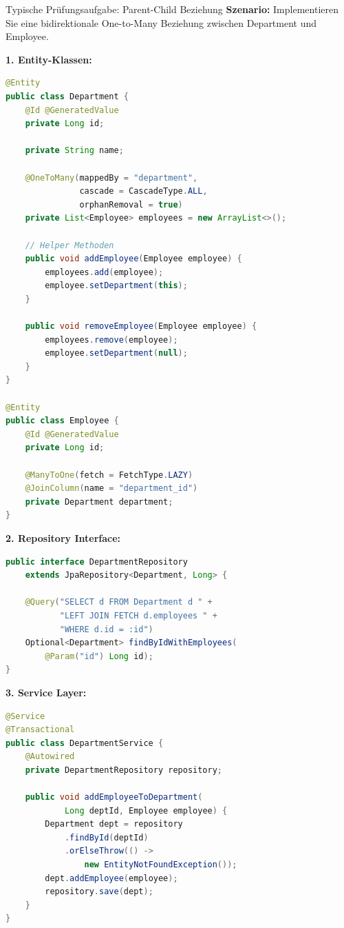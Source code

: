 \begin{example2}{Typische Prüfungsaufgabe: Parent-Child Beziehung}
\textbf{Szenario:}
Implementieren Sie eine bidirektionale One-to-Many Beziehung zwischen Department und Employee.

\textbf{1. Entity-Klassen:}
\begin{lstlisting}[language=Java, style=base]
@Entity
public class Department {
    @Id @GeneratedValue
    private Long id;
    
    private String name;
    
    @OneToMany(mappedBy = "department", 
               cascade = CascadeType.ALL,
               orphanRemoval = true)
    private List<Employee> employees = new ArrayList<>();
    
    // Helper Methoden
    public void addEmployee(Employee employee) {
        employees.add(employee);
        employee.setDepartment(this);
    }
    
    public void removeEmployee(Employee employee) {
        employees.remove(employee);
        employee.setDepartment(null);
    }
}

@Entity
public class Employee {
    @Id @GeneratedValue
    private Long id;
    
    @ManyToOne(fetch = FetchType.LAZY)
    @JoinColumn(name = "department_id")
    private Department department;
}
\end{lstlisting}

\textbf{2. Repository Interface:}
\begin{lstlisting}[language=Java, style=base]
public interface DepartmentRepository 
    extends JpaRepository<Department, Long> {
    
    @Query("SELECT d FROM Department d " +
           "LEFT JOIN FETCH d.employees " +
           "WHERE d.id = :id")
    Optional<Department> findByIdWithEmployees(
        @Param("id") Long id);
}
\end{lstlisting}

\textbf{3. Service Layer:}
\begin{lstlisting}[language=Java, style=base]
@Service
@Transactional
public class DepartmentService {
    @Autowired
    private DepartmentRepository repository;
    
    public void addEmployeeToDepartment(
            Long deptId, Employee employee) {
        Department dept = repository
            .findById(deptId)
            .orElseThrow(() -> 
                new EntityNotFoundException());
        dept.addEmployee(employee);
        repository.save(dept);
    }
}
\end{lstlisting}
\end{example2}

